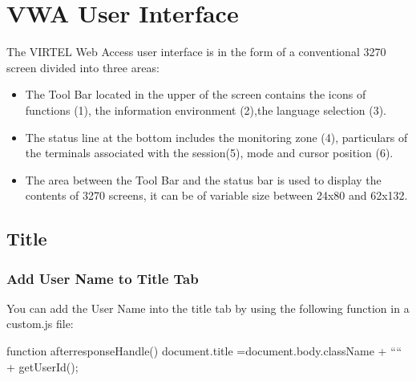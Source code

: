 \documentclass[letterpaper,10pt,english]{sphinxmanual}
\begin{document}
\section{VWA User Interface}
\label{\detokenize{Customization:vwa-user-interface}}\label{\detokenize{Customization:index-15}}
\sphinxAtStartPar
The VIRTEL Web Access user interface is in the form of a conventional 3270 screen divided into three areas:
\begin{itemize}
\item {} 
\sphinxAtStartPar
The Tool Bar located in the upper of the screen contains the icons of functions (1), the information environment (2),the language selection (3).

\item {} 
\sphinxAtStartPar
The status line at the bottom includes the monitoring zone (4), particulars of the terminals associated with the session(5), mode and cursor position (6).

\item {} 
\sphinxAtStartPar
The area between the Tool Bar and the status bar is used to display the contents of 3270 screens, it can be of variable size between 24x80 and 62x132.

\end{itemize}

\sphinxAtStartPar
{}


\subsection{Title}
\label{\detokenize{Customization:title}}
\ignorespaces 

\subsubsection{Add User Name to Title Tab}
\label{\detokenize{Customization:add-user-name-to-title-tab}}\label{\detokenize{Customization:index-16}}
\sphinxAtStartPar
You can add the User Name into the title tab by using the following function in a custom.js file:

\begin{sphinxVerbatim}[commandchars=\\\{\}]
function after\PYGZus{}responseHandle() \PYGZob{}
    document.title =document.body.className + “\PYGZhy{}“ + getUserId();
\PYGZcb{}
\end{sphinxVerbatim}
\end{document}
